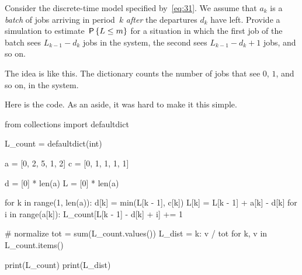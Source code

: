 \begin{exercise}\label{ex:l-166}
Consider 
 the discrete-time model specified by~\cref{eq:31}. We assume that $a_{k}$ is a \emph{batch} of jobs arriving in period~$k$ \emph{after} the departures $d_k$ have left.
Provide a simulation to estimate  $\,\mathsf{P}\left\{L\leq m\right\}$ for a situation in which  the first job of the batch sees $L_{k-1} - d_k$ jobs in the system,
the second sees $L_{k-1}-d_k + 1$ jobs, and so on.
\begin{solution}
The idea is like this. The dictionary  counts the number of jobs that see $0$, $1$, and so on, in the system.

Here is the code. As an aside, it was hard to make it this simple.
\begin{pyconsole}
from collections import defaultdict

L_count = defaultdict(int)

a = [0, 2, 5, 1, 2]
c = [0, 1, 1, 1, 1]

d = [0] * len(a)
L = [0] * len(a)

for k in range(1, len(a)):
    d[k] = min(L[k - 1], c[k])
    L[k] = L[k - 1] + a[k] - d[k]
    for i in range(a[k]):
        L_count[L[k - 1] - d[k] + i] += 1


# normalize
tot = sum(L_count.values())
L_dist = {k: v / tot for k, v in L_count.items()}

print(L_count)
print(L_dist)
\end{pyconsole}

\end{solution}
\end{exercise}



